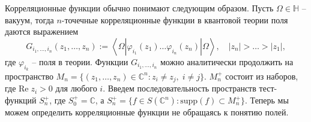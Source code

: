 Корреляционные функции обычно понимают следующим образом.   Пусть $\Omega\in\mathbb{H}$ -- вакуум, тогда $n$-точечные корреляционные функции в квантовой теории поля даются выражением
\begin{equation}
  \label{eq:50}
  G_{i_{1},\dots ,i_{n}}(z_{1},\dots,z_{n}):=\left<\Omega|\varphi_{i_{1}}(z_{1})\dots \varphi_{i_{n}}(z_{n})|\Omega\right>, \quad |z_{n}|>\dots > |z_{1}|,
\end{equation}
где $\varphi_{i_{k}}$ -- поля в теории. Функции $G_{i_{1},\dots,i_{n}}$ можно аналитически продолжить на пространство $M_{n}=\{(z_{1},\dots,z_{n})\in \mathbb{C}^{n}: z_{i}\neq z_{j},\; i\neq j\}$. $M_{n}^{+}$ состоит из наборов, где $\mathrm{Re}\;z_{i}>0$ для любого $i$. Введем последовательность пространств тест-функций $S_{n}^{+}$, где $S_{0}^{+}=\mathbb{C}$, а $S_{n}^{+}=\{f\in S(\mathbb{C}^{n}): \mathrm{supp}(f)\subset M^{+}_{n}\} $. Теперь мы можем определить корреляционные функции не обращаясь к понятию полей. 

